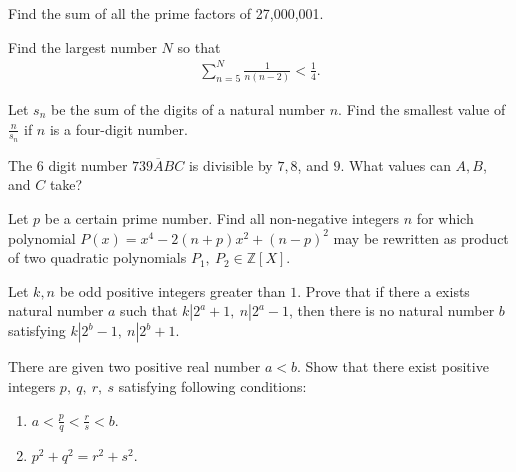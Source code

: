 \documentclass[problems.tex]{subfile}
\begin{document}
	
	
	
	\begin{problem}
		Find the sum of all the prime factors of 27,000,001.
	\end{problem}
	
	
	
	\begin{problem}
		Find the largest number $N$ so that
		\begin{align*}
			\sum_{n=5}^{N} \frac{1}{n(n-2)} < \frac{1}{4}.
		\end{align*}
	\end{problem}
	
	
	\begin{problem}
		Let $s_n$ be the sum of the digits of a natural number $n$. Find the smallest value of $\frac{n}{s_n}$ if $n$ is a four-digit number.
	\end{problem}
	
	
	
	\begin{problem}
		The $6$ digit number $\overline{739ABC}$ is divisible by $7, 8$, and $9$. What values can $A, B$, and $C$ take?
	\end{problem}
	
	\begin{problem}
		Let $p$ be a certain prime number. Find all non-negative integers $n$ for which polynomial $P(x)=x^4-2(n+p)x^2+(n-p)^2$ may be rewritten as product of two quadratic polynomials $P_1, \ P_2 \in \mathbb{Z}[X]$. %
	\end{problem}
	
	
	
	
	\begin{problem}
		Let $k, n$ be odd positive integers greater than $1$. Prove that if there a exists natural number $a$ such that $k|2^a+1, \ n|2^a-1$, then there is no natural number $b$ satisfying $k|2^b-1, \ n|2^b+1$. %
	\end{problem}
	
	
	
	\begin{problem}
		There are given two positive real number $a<b$. Show that there exist positive integers $p, \ q, \ r, \ s$ satisfying following conditions:
		\begin{enumerate}
			\item $a< \frac{p}{q} < \frac{r}{s} < b$.
			\item $p^2+q^2=r^2+s^2$.
		\end{enumerate}
	\end{problem}
	
\end{document}

